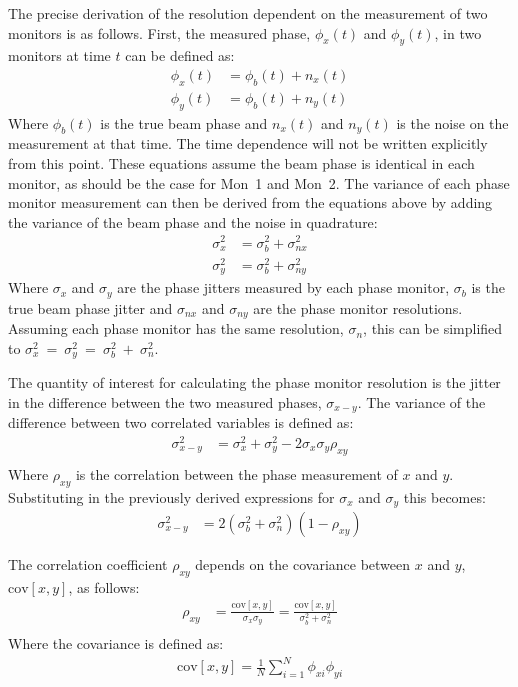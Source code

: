 The precise derivation of the resolution dependent on the measurement of two monitors is as follows. First, the measured phase, \(\phi_x(t)\) and \(\phi_y(t)\), in two monitors at time \(t\) can be defined as:
\begin{align}
\phi_x(t) &= \phi_b(t) + n_x(t) \\
\phi_y(t) &= \phi_b(t) + n_y(t)
\end{align}
Where \(\phi_b(t)\) is the true beam phase and \(n_x(t)\) and \(n_y(t)\) is the noise on the measurement at that time. The time dependence will not be written explicitly from this point. These equations assume the beam phase is identical in each monitor, as should be the case for Mon~1 and Mon~2. The variance of each phase monitor measurement can then be derived from the equations above by adding the variance of the beam phase and the noise in quadrature:
\begin{align}
\sigma_x^2 &= \sigma_b^2 + \sigma_{nx}^2 \label{e:measJitWithRes} \\
\sigma_y^2 &= \sigma_b^2 + \sigma_{ny}^2
\end{align}
Where \(\sigma_x\) and \(\sigma_y\) are the phase jitters measured by each phase monitor, \(\sigma_b\) is the true beam phase jitter and \(\sigma_{nx}\) and \(\sigma_{ny}\) are the phase monitor resolutions. Assuming each phase monitor has the same resolution, \(\sigma_n\), this can be simplified to \(\sigma_x^2~=~\sigma_y^2~=~\sigma_b^2~+~\sigma_n^2\).

The quantity of interest for calculating the phase monitor resolution is the jitter in the difference between the two measured phases, \(\sigma_{x-y}\). The variance of the difference between two correlated variables is defined as:
\begin{align}
\sigma_{x-y}^2 &= \sigma_x^2 + \sigma_y^2 - 2\sigma_x\sigma_y\rho_{xy} \\
\end{align}
Where \(\rho_{xy}\) is the correlation between the phase measurement of \(x\) and \(y\). Substituting in the previously derived expressions for \(\sigma_x\) and \(\sigma_y\) this becomes:
\begin{align}
\sigma_{x-y}^2 &= 2(\sigma_b^2 + \sigma_n^2)(1-\rho_{xy})
\end{align}

The correlation coefficient \(\rho_{xy}\) depends on the covariance between \(x\) and \(y\), \(\mathrm{cov}[x,y]\), as follows:
\begin{align}
\rho_{xy} &= \frac{\mathrm{cov}[x,y]}{\sigma_x\sigma_y} = \frac{\mathrm{cov}[x,y]}{\sigma_b^2+\sigma_n^2} \\
\end{align}
Where the covariance is defined as:
\begin{align}
\mathrm{cov}[x,y] = \frac{1}{N}\sum_{i=1}^{N}\phi_{xi}\phi_{yi} \\
\end{align}

